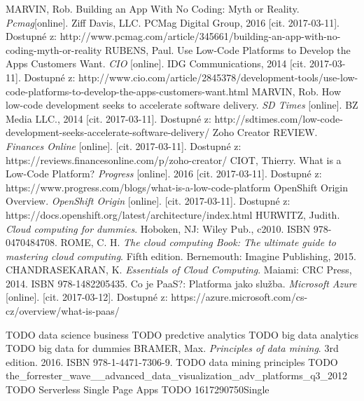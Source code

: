 \begin{thebibliography}{99}

MARVIN, Rob. Building an App With No Coding: Myth or Reality. 
\textit{Pcmag}[online].
 Ziff Davis, LLC. PCMag Digital Group, 2016 [cit. 2017-03-11]. Dostupné z: http://www.pcmag.com/article/345661/building-an-app-with-no-coding-myth-or-reality
RUBENS, Paul. Use Low-Code Platforms to Develop the Apps Customers Want.
\textit{CIO} [online].
IDG Communications, 2014 [cit. 2017-03-11]. Dostupné z: http://www.cio.com/article/2845378/development-tools/use-low-code-platforms-to-develop-the-apps-customers-want.html
MARVIN, Rob. How low-code development seeks to accelerate software delivery.
\textit{SD Times} [online].
BZ Media LLC., 2014 [cit. 2017-03-11]. Dostupné z: http://sdtimes.com/low-code-development-seeks-accelerate-software-delivery/
Zoho Creator REVIEW.
\textit{Finances Online} [online].
[cit. 2017-03-11]. Dostupné z: https://reviews.financesonline.com/p/zoho-creator/
CIOT, Thierry. What is a Low-Code Platform?
\textit{Progress} [online].
2016 [cit. 2017-03-11]. Dostupné z: https://www.progress.com/blogs/what-is-a-low-code-platform
OpenShift Origin Overview.
\textit{OpenShift Origin} [online].
[cit. 2017-03-11]. Dostupné z: https://docs.openshift.org/latest/architecture/index.html
HURWITZ, Judith.
\textit{Cloud computing for dummies}.
Hoboken, NJ: Wiley Pub., c2010. ISBN 978-0470484708.
ROME, C. H. 
\textit{The cloud computing Book: The ultimate guide to mastering cloud computing}.
Fifth edition. Bernemouth: Imagine Publishing, 2015.
CHANDRASEKARAN, K. 
\textit{Essentials of Cloud Computing}.
Maiami: CRC Press, 2014. ISBN 978-1482205435.
Co je PaaS?: Platforma jako služba.
\textit{Microsoft Azure} [online].
[cit. 2017-03-12]. Dostupné z: https://azure.microsoft.com/cs-cz/overview/what-is-paas/

TODO data science business
TODO predctive analytics
TODO big data analytics
TODO big data for dummies
BRAMER, Max.
\textit{Principles of data mining}.
3rd edition. 2016. ISBN 978-1-4471-7306-9.
TODO data mining principles
TODO the_forrester_wave__advanced_data_visualization_adv_platforms_q3_2012
TODO Serverless Single Page Apps
TODO 1617290750Single


\end{thebibliography}
